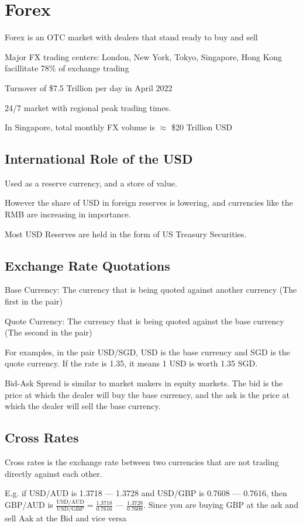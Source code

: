 \section{Forex}
Forex is an OTC market with dealers that stand ready to buy and sell

Major FX trading centers: London, New York, Tokyo, Singapore, Hong Kong facillitate 78\% of exchange trading

Turnover of \$7.5 Trillion per day in April 2022

24/7 market with regional peak trading times.

In Singapore, total monthly FX volume is $\approx$ \$20 Trillion USD

\subsection{International Role of the USD}
Used as a reserve currency, and a store of value.

However the share of USD in foreign reserves is lowering, and currencies like the RMB are increasing in importance.

Most USD Reserves are held in the form of US Treasury Securities.

\subsection{Exchange Rate Quotations}
Base Currency: The currency that is being quoted against another currency (The first in the pair)

Quote Currency: The currency that is being quoted against the base currency (The second in the pair)

For examples, in the pair USD/SGD, USD is the base currency and SGD is the quote currency. If the rate is 1.35, it means 1 USD is worth 1.35 SGD.

Bid-Ask Spread is similar to market makers in equity markets. The bid is the price at which the dealer will buy the base currency, and the ask is the price at which the dealer will sell the base currency.

\subsection{Cross Rates}
Cross rates is the exchange rate between two currencies that are not trading directly against each other.

E.g. if USD/AUD is 1.3718 --- 1.3728 and USD/GBP is 0.7608 --- 0.7616, then GBP/AUD is $\frac{\text{USD/AUD}}{\text{USD/GBP}} = \frac{1.3718}{0.7616}$ --- $\frac{1.3728}{0.7608}$. Since you are buying GBP at the ask and sell Aak at the Bid and vice versa

